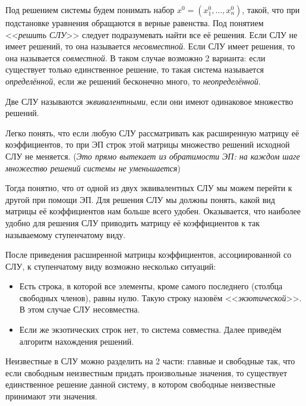 \begin{df}
  Под решением системы будем понимать набор $x^0 = (x_1^0,\ldots,x_n^0)$, такой, что при подстановке уравнения обращаются в верные равенства. Под понятием <<\emph{решить СЛУ}>> следует подразумевать найти все её решения. Если СЛУ не имеет решений, то она называется \emph{несовместной}. Если СЛУ имеет решения, то она называется \emph{совместной}. В таком случае возможно 2 варианта: если существует только единственное решение, то такая система называется \emph{определённой}, если же решений бесконечно много, то \emph{неопределённой}.%
\end{df}

\begin{df}
  Две СЛУ называются \emph{эквивалентными}, если они имеют одинаковое множество решений.
\end{df}

Легко понять, что если любую СЛУ рассматривать как расширенную матрицу её коэффициентов, то при ЭП строк этой матрицы множество решений исходной СЛУ не меняется. (\emph{Это прямо вытекает из обратимости ЭП: на каждом шаге множество решений системы не уменьшается})

 Тогда понятно, что от одной из двух эквивалентных СЛУ мы можем перейти к другой при помощи ЭП. Для решения СЛУ мы должны понять, какой вид матрицы её коэффициентов нам больше всего удобен. Оказывается, что наиболее удобно для решения СЛУ приводить матрицу её коэффициентов к так называемому ступенчатому виду.

  После приведения расширенной матрицы коэффициентов, ассоциированной со СЛУ, к ступенчатому виду возможно несколько ситуаций:
  \begin{itemize}
    \item Есть строка, в которой все элементы, кроме самого последнего (столбца свободных членов), равны нулю. Такую строку назовём <<\emph{экзотической}>>. В этом случае СЛУ несовместна.
    \item Если же экзотических строк нет, то система совместна. Далее приведём алгоритм нахождения решений.
  \end{itemize}

  Неизвестные в СЛУ можно разделить на 2 части: главные и свободные так, что если свободным неизвестным придать произвольные значения, то существует единственное решение данной систему, в котором свободные неизвестные принимают эти значения.

